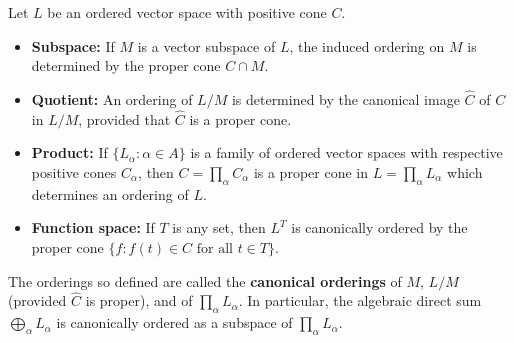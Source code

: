Let $L$ be an ordered vector space with positive cone $C$.

\begin{itemize}
\item \textbf{Subspace:} If $M$ is a vector subspace of $L$, the induced ordering on $M$ is determined by the proper cone $C \cap M$.
\item \textbf{Quotient:} An ordering of $L/M$ is determined by the canonical image $\hat{C}$ of $C$ in $L/M$, provided that $\hat{C}$ is a proper cone.
\item \textbf{Product:} If $\{L_\alpha : \alpha \in A\}$ is a family of ordered vector spaces with respective positive cones $C_\alpha$, then $C = \prod_\alpha C_\alpha$ is a proper cone in $L = \prod_\alpha L_\alpha$ which determines an ordering of $L$.
\item \textbf{Function space:} If $T$ is any set, then $L^T$ is canonically ordered by the proper cone $\{f : f(t) \in C \text{ for all } t \in T\}$.
\end{itemize}

The orderings so defined are called the \textbf{canonical orderings} of $M$, $L/M$ (provided $\hat{C}$ is proper), and of $\prod_\alpha L_\alpha$. In particular, the algebraic direct sum $\bigoplus_\alpha L_\alpha$ is canonically ordered as a subspace of $\prod_\alpha L_\alpha$.
